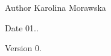 \begin{DoxyAuthor}{Author}
Karolina Morawska 
\end{DoxyAuthor}
\begin{DoxyDate}{Date}
01.. 
\end{DoxyDate}
\begin{DoxyVersion}{Version}
0. 
\end{DoxyVersion}
